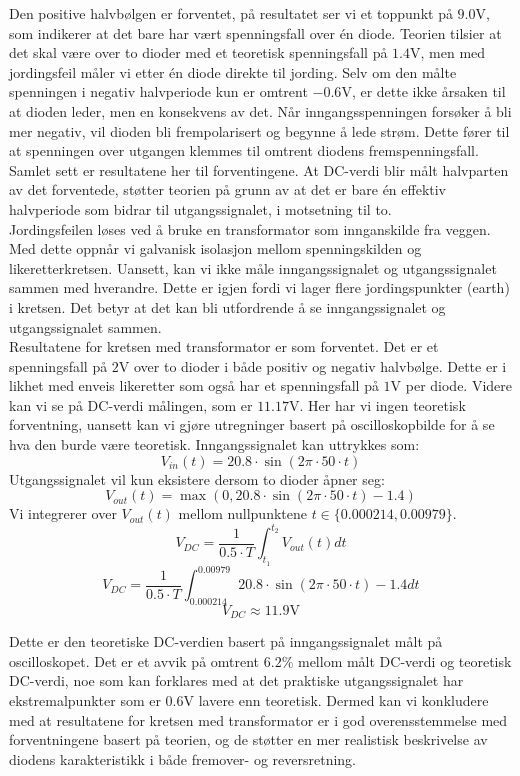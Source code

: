 \noindent
Den positive halvbølgen er forventet, på resultatet ser vi et toppunkt på $9.0\text{V}$, som indikerer at det bare har vært spenningsfall over én diode. Teorien tilsier at det skal være over to dioder med et teoretisk spenningsfall på $1.4\text{V}$, men med jordingsfeil måler vi etter én diode direkte til jording. Selv om den målte spenningen i negativ halvperiode kun er omtrent $-0.6\text{V}$, er dette ikke årsaken til at dioden leder, men en konsekvens av det. Når inngangsspenningen forsøker å bli mer negativ, vil dioden bli frempolarisert og begynne å lede strøm. Dette fører til at spenningen over utgangen klemmes til omtrent diodens fremspenningsfall. Samlet sett er resultatene her til forventingene. At DC-verdi blir målt halvparten av det forventede, støtter teorien på grunn av at det er bare én effektiv halvperiode som bidrar til utgangssignalet, i motsetning til to.
\\[1em]
Jordingsfeilen løses ved å bruke en transformator som innganskilde fra veggen. Med dette oppnår vi galvanisk isolasjon mellom spenningskilden og likeretterkretsen. Uansett, kan vi ikke måle inngangssignalet og utgangssignalet sammen med hverandre. Dette er igjen fordi vi lager flere jordingspunkter (earth) i kretsen. Det betyr at det kan bli utfordrende å se inngangssignalet og utgangssignalet sammen.
\\[1em]
Resultatene for kretsen med transformator er som forventet. Det er et spenningsfall på $2\text{V}$ over to dioder i både positiv og negativ halvbølge. Dette er i likhet med enveis likeretter som også har et spenningsfall på $1\text{V}$ per diode. Videre kan vi se på DC-verdi målingen, som er $11.17\text{V}$. Her har vi ingen teoretisk forventning, uansett kan vi gjøre utregninger basert på oscilloskopbilde for å se hva den burde være teoretisk. Inngangssignalet kan uttrykkes som:
\[
V_{in}(t) = 20.8 \cdot \sin \left(2\pi \cdot 50 \cdot t\right)
\]
\noindent
Utgangssignalet vil kun eksistere dersom to dioder åpner seg:
\[
V_{out}(t) = \max \left(0, 20.8 \cdot \sin \left(2\pi \cdot 50 \cdot t\right) - 1.4\right)
\]
\noindent
Vi integrerer over $V_{out}(t)$ mellom nullpunktene $t \in \{0.000214, 0.00979\}$.
\[
V_{DC} = \frac{1}{0.5 \cdot T} \int_{t_1}^{t_2} V_{out}(t) dt
\]
\vspace{0.1cm}
\[
V_{DC} = \frac{1}{0.5 \cdot T} \int_{0.000214}^{0.00979} 20.8 \cdot \sin \left(2\pi \cdot 50 \cdot t\right) - 1.4 dt
\]
\vspace{0.1cm}
\[
V_{DC} \approx 11.9\text{V}
\]

\noindent
Dette er den teoretiske DC-verdien basert på inngangssignalet målt på oscilloskopet. Det er et avvik på omtrent $6.2\%$ mellom målt DC-verdi og teoretisk DC-verdi, noe som kan forklares med at det praktiske utgangssignalet har ekstremalpunkter som er $0.6\text{V}$ lavere enn teoretisk. Dermed kan vi konkludere med at resultatene for kretsen med transformator er i god overensstemmelse med forventningene basert på teorien, og de støtter en mer realistisk beskrivelse av diodens karakteristikk i både fremover- og reversretning.

